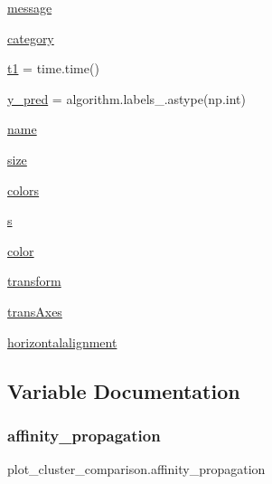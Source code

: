 \begin{DoxyCompactItemize}
\item 
\hyperlink{namespaceplot__cluster__comparison_aa1840dff73ef46ac7f6fdbec95398228}{message}
\item 
\hyperlink{namespaceplot__cluster__comparison_ab41605764644eb78915c2ce8dbc4bd89}{category}
\item 
\hyperlink{namespaceplot__cluster__comparison_ab817cb5191efdabf7ab5a885b726b4e6}{t1} = time.\+time()
\item 
\hyperlink{namespaceplot__cluster__comparison_a7fa61c4bcf3596c9427ce85335b90450}{y\+\_\+pred} = algorithm.\+labels\+\_\+.\+astype(np.\+int)
\item 
\hyperlink{namespaceplot__cluster__comparison_aeac909c579e7c35b640628cfab971467}{name}
\item 
\hyperlink{namespaceplot__cluster__comparison_a201c09752f95b79007d536565664943b}{size}
\item 
\hyperlink{namespaceplot__cluster__comparison_ae58ce95ccc2b06b67de222e1165e4706}{colors}
\item 
\hyperlink{namespaceplot__cluster__comparison_a81e95ad5d4984732543d470657a92665}{s}
\item 
\hyperlink{namespaceplot__cluster__comparison_af240eda41b5ec0a14b679276ca981cd4}{color}
\item 
\hyperlink{namespaceplot__cluster__comparison_a90afe723998c14bb5c504776a5cc0e5e}{transform}
\item 
\hyperlink{namespaceplot__cluster__comparison_aae4c838f77b63e7c29d5177bab684196}{trans\+Axes}
\item 
\hyperlink{namespaceplot__cluster__comparison_ac2b8fbd09f4504a207289ec252501620}{horizontalalignment}
\end{DoxyCompactItemize}


\subsection{Variable Documentation}
\mbox{\label{namespaceplot__cluster__comparison_a44fd5ccc0a17d8338c014bd8a51e4292}} 
\subsubsection{\texorpdfstring{affinity\+\_\+propagation}{affinity\_propagation}}
{\footnotesize\ttfamily plot\+\_\+cluster\+\_\+comparison.\+affinity\+\_\+propagation}

